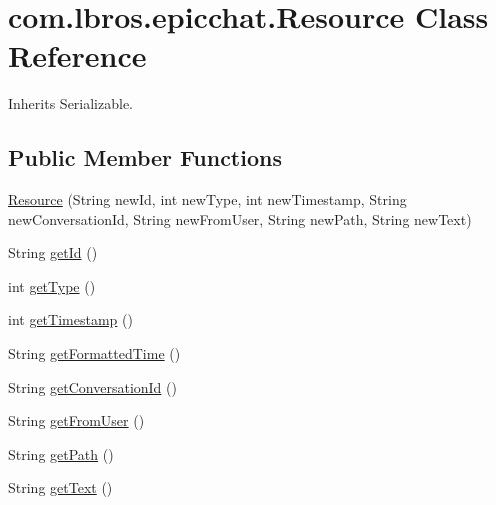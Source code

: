 \hypertarget{classcom_1_1lbros_1_1epicchat_1_1_resource}{\section{com.\-lbros.\-epicchat.\-Resource Class Reference}
\label{classcom_1_1lbros_1_1epicchat_1_1_resource}
}


Inherits Serializable.

\subsection*{Public Member Functions}
\begin{DoxyCompactItemize}
\item 
\hyperlink{classcom_1_1lbros_1_1epicchat_1_1_resource_a48b92f4f72f5a37c319ae7a7ad698356}{Resource} (String new\-Id, int new\-Type, int new\-Timestamp, String new\-Conversation\-Id, String new\-From\-User, String new\-Path, String new\-Text)
\item 
String \hyperlink{classcom_1_1lbros_1_1epicchat_1_1_resource_af21adfe62914e726d62a31e019f3d833}{get\-Id} ()
\item 
int \hyperlink{classcom_1_1lbros_1_1epicchat_1_1_resource_a510947e76f56b8b8bcc9bcc459a73776}{get\-Type} ()
\item 
int \hyperlink{classcom_1_1lbros_1_1epicchat_1_1_resource_a199b6ea81d67882d9ab3fb87452892e4}{get\-Timestamp} ()
\item 
String \hyperlink{classcom_1_1lbros_1_1epicchat_1_1_resource_afa8c7075bbacb17b2943288e0f181aef}{get\-Formatted\-Time} ()
\item 
String \hyperlink{classcom_1_1lbros_1_1epicchat_1_1_resource_aefe35aa14136d43142e9fdc4e48f41b2}{get\-Conversation\-Id} ()
\item 
String \hyperlink{classcom_1_1lbros_1_1epicchat_1_1_resource_a6b9029e2353505036abf7540d5c2dc3c}{get\-From\-User} ()
\item 
String \hyperlink{classcom_1_1lbros_1_1epicchat_1_1_resource_a7b8106f8bc7e69e4633df437de370120}{get\-Path} ()
\item 
String \hyperlink{classcom_1_1lbros_1_1epicchat_1_1_resource_acbff8c79cf208122f5908428bfef6049}{get\-Text} ()
\end{DoxyCompactItemize}
